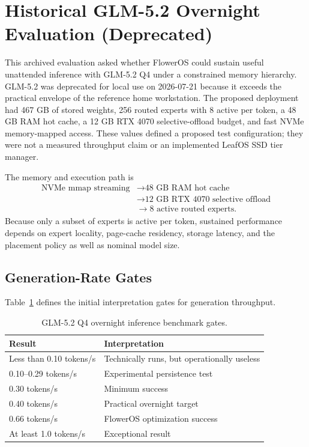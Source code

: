 \documentclass[11pt]{article}
\begin{document}
\section{Historical GLM-5.2 Overnight Evaluation (Deprecated)}

This archived evaluation asked whether FlowerOS could sustain useful unattended inference with GLM-5.2 Q4 under a constrained memory hierarchy. GLM-5.2 was deprecated for local use on 2026-07-21 because it exceeds the practical envelope of the reference home workstation. The proposed deployment had 467 GB of stored weights, 256 routed experts with 8 active per token, a 48 GB RAM hot cache, a 12 GB RTX 4070 selective-offload budget, and fast NVMe memory-mapped access. These values defined a proposed test configuration; they were not a measured throughput claim or an implemented LeafOS SSD tier manager.

The memory and execution path is
\[
\begin{aligned}
\text{NVMe mmap streaming} &\rightarrow \text{48 GB RAM hot cache} \\
&\rightarrow \text{12 GB RTX 4070 selective offload} \\
&\rightarrow \text{8 active routed experts}.
\end{aligned}
\]
Because only a subset of experts is active per token, sustained performance depends on expert locality, page-cache residency, storage latency, and the placement policy as well as nominal model size.

\subsection{Generation-Rate Gates}

Table~\ref{tab:glm-gates} defines the initial interpretation gates for generation throughput.

\begin{table}[h]
\centering
\caption{GLM-5.2 Q4 overnight inference benchmark gates.}
\label{tab:glm-gates}
\begin{tabular}{ll}
\toprule
Result & Interpretation \\
\midrule
Less than 0.10 tokens/s & Technically runs, but operationally useless \\
0.10--0.29 tokens/s & Experimental persistence test \\
0.30 tokens/s & Minimum success \\
0.40 tokens/s & Practical overnight target \\
0.66 tokens/s & FlowerOS optimization success \\
At least 1.0 tokens/s & Exceptional result \\
\bottomrule
\end{tabular}
\end{table}
\end{document}

